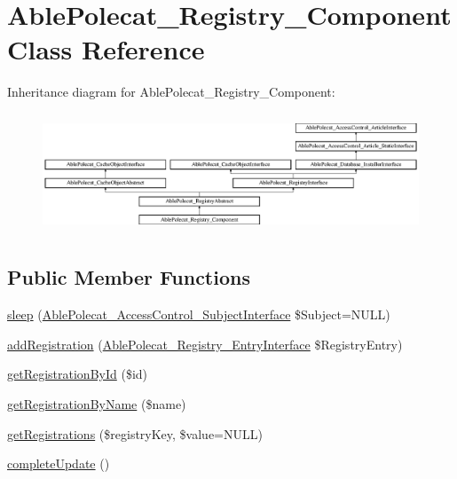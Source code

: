\hypertarget{class_able_polecat___registry___component}{}\section{Able\+Polecat\+\_\+\+Registry\+\_\+\+Component Class Reference}
\label{class_able_polecat___registry___component}
Inheritance diagram for Able\+Polecat\+\_\+\+Registry\+\_\+\+Component\+:\begin{figure}[H]
\begin{center}
\leavevmode
\includegraphics[height=3.612903cm]{class_able_polecat___registry___component}
\end{center}
\end{figure}
\subsection*{Public Member Functions}
\begin{DoxyCompactItemize}
\item 
\hyperlink{class_able_polecat___registry___component_a365e24d7b066205cafa2a5cce3a4f224}{sleep} (\hyperlink{interface_able_polecat___access_control___subject_interface}{Able\+Polecat\+\_\+\+Access\+Control\+\_\+\+Subject\+Interface} \$Subject=N\+U\+L\+L)
\item 
\hyperlink{class_able_polecat___registry___component_a22d8ddb551ccf544f1d2615db68ca9b1}{add\+Registration} (\hyperlink{interface_able_polecat___registry___entry_interface}{Able\+Polecat\+\_\+\+Registry\+\_\+\+Entry\+Interface} \$Registry\+Entry)
\item 
\hyperlink{class_able_polecat___registry___component_a06a999816a4143bb407c09628018a874}{get\+Registration\+By\+Id} (\$id)
\item 
\hyperlink{class_able_polecat___registry___component_a11594a43c95ab62b4841717c17cf0e54}{get\+Registration\+By\+Name} (\$name)
\item 
\hyperlink{class_able_polecat___registry___component_a8ed45a29bdb30603896e12d7bbf208b5}{get\+Registrations} (\$registry\+Key, \$value=N\+U\+L\+L)
\item 
\hyperlink{class_able_polecat___registry___component_a363ee22699ad46520333ef24f64798bb}{complete\+Update} ()
\end{DoxyCompactItemize}
